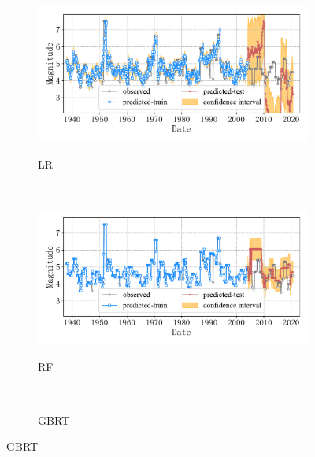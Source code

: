 \begin{figure}[!htbp]
\begin{subfigure}[b]{0.45\textwidth}
    \caption{LR}
    \vspace{-0.2cm}
    \includegraphics[width=\textwidth]{Img/chap5_seism/block4/seism_lr_minyear_1932_maxyear_2021_spanlat_2_spanlon_4_timewindow_72_nextmonth_12_minmag_3.0_block_4.pdf}
    \vspace{-1cm}
    \label{fig:seism_lr_minyear_1932_maxyear_2021_spanlat_2_spanlon_4_timewindow_72_nextmonth_12_minmag_3.0_block_4}
  \end{subfigure}
  ~
  \begin{subfigure}[b]{0.45\textwidth}
    \caption{RF}
    \vspace{-0.2cm}
    \includegraphics[width=\textwidth]{Img/chap5_seism/block4/seism_rf_minyear_1932_maxyear_2021_spanlat_2_spanlon_4_timewindow_72_nextmonth_12_minmag_3.0_block_4.pdf}
    \vspace{-1cm}
    \label{fig:seism_rf_minyear_1932_maxyear_2021_spanlat_2_spanlon_4_timewindow_72_nextmonth_12_minmag_3.0_block_4}
  \end{subfigure}
  \\
  \begin{subfigure}[b]{0.45\textwidth}
    \caption{GBRT}
    \vspace{-0.2cm}

\end{subfigure}
\end{figure}
